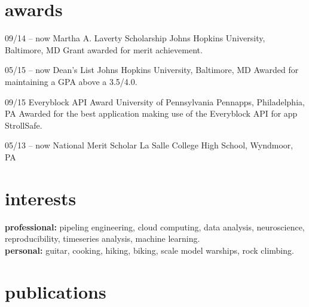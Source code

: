 \documentclass[]{friggeri-cv} %
\begin{document}

\section{awards}

\begin{entrylist}
\entry
{09/14 -- now}
{Martha A. Laverty Scholarship}
{Johns Hopkins University, Baltimore, MD}
{Grant awarded for merit achievement.}

\entry
{05/15 -- now}
{Dean's List}
{Johns Hopkins University, Baltimore, MD}
{Awarded for maintaining a GPA above a 3.5/4.0.}


\entry
{09/15}
{Everyblock API Award}
{University of Pennsylvania Pennapps, Philadelphia, PA}
{Awarded for the best application making use of the Everyblock API for app StrollSafe.}

\entry
{05/13 -- now}
{National Merit Scholar}
{La Salle College High School, Wyndmoor, PA}
{}

\end{entrylist}


\newpage
\section{interests}

\textbf{professional:} pipeling engineering, cloud computing, data analysis, neuroscience, reproducibility, timeseries analysis, machine learning.\\
\textbf{personal:} guitar, cooking, hiking, biking, scale model warships, rock climbing.


\section{publications}





\end{document}
